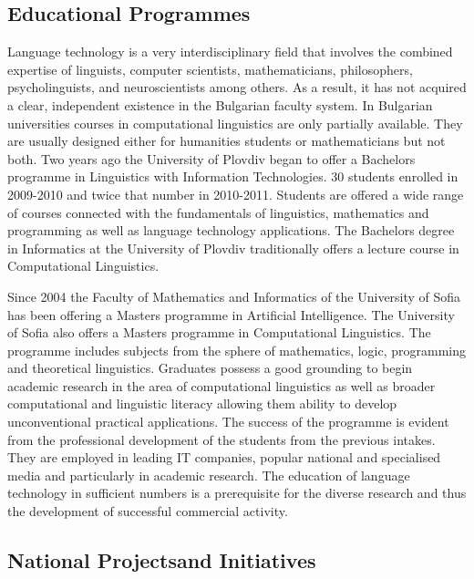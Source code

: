 \documentclass[]{../../metanetpaper}
\begin{document}
\begin{multicols}{2}
\subsection{Educational Programmes}

Language technology is a very interdisciplinary field that involves the combined expertise of linguists, computer scientists, mathematicians, philosophers, psycholinguists, and neuroscientists among others. As a result, it has not acquired a clear, independent existence in the Bulgarian faculty system. In Bulgarian universities courses in computational linguistics are only partially available. They are usually designed either for humanities students or mathematicians but not both. Two years ago the University of Plovdiv began to offer a Bachelors programme in Linguistics with Information Technologies. 30 students enrolled in 2009-2010 and twice that number in 2010-2011. Students are offered a wide range of courses connected with the fundamentals of linguistics, mathematics and programming as well as language technology applications. The Bachelors degree in Informatics at the University of Plovdiv traditionally offers a lecture course in Computational Linguistics. 

Since 2004 the Faculty of Mathematics and Informatics of the University of Sofia has been offering a Masters programme in Artificial Intelligence. The University of Sofia also offers a Masters programme in Computational Linguistics. The programme includes subjects from the sphere of mathematics, logic, programming and theoretical linguistics. Graduates possess a good grounding to begin academic research in the area of computational linguistics as well as broader computational and linguistic literacy allowing them ability to develop unconventional practical applications. The success of the programme is evident from the professional development of the students from the previous intakes. They are employed in leading IT companies, popular national and specialised media and particularly in academic research.
The education of language technology in sufficient numbers is a prerequisite for the diverse research and thus the development of successful commercial activity.

\subsection[National Projects and Initiatives]{National Projects\newline and Initiatives}


\end{multicols}
\end{document}
